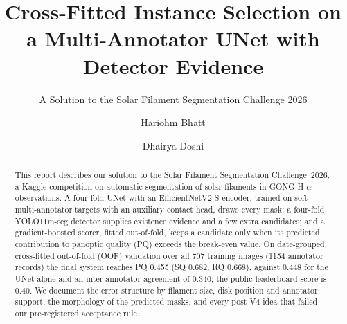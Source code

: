 \documentclass[sigconf]{acmart}
\begin{document}
\title{Cross-Fitted Instance Selection on a Multi-Annotator UNet with Detector Evidence}  %
\subtitle{A Solution to the Solar Filament Segmentation Challenge 2026} %


\author{Hariohm Bhatt}

\author{Dhairya Doshi}

\begin{abstract}
    This report describes our solution to the Solar Filament Segmentation Challenge~2026, a Kaggle competition on automatic segmentation of solar filaments in GONG H-$\alpha$ observations. A four-fold UNet with an EfficientNetV2-S encoder, trained on soft multi-annotator targets with an auxiliary contact head, draws every mask; a four-fold YOLO11m-seg detector supplies existence evidence and a few extra candidates; and a gradient-boosted scorer, fitted out-of-fold, keeps a candidate only when its predicted contribution to panoptic quality (PQ) exceeds the break-even value. On date-grouped, cross-fitted out-of-fold (OOF) validation over all 707 training images (1154 annotator records) the final system reaches PQ 0.455 (SQ 0.682, RQ 0.668), against 0.448 for the UNet alone and an inter-annotator agreement of 0.340; the public leaderboard score is 0.40. We document the error structure by filament size, disk position and annotator support, the morphology of the predicted masks, and every post-V4 idea that failed our pre-registered acceptance rule.
\end{abstract}

\maketitle

\ifguideStyle
{}
\par\medskip
\fi

\end{document}
